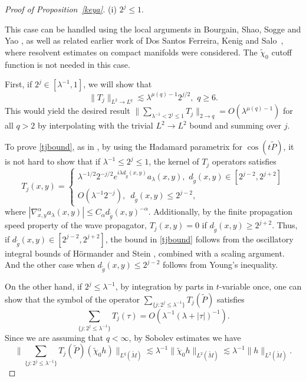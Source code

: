 \documentclass[10pt]{amsart}
\newcommand{\la}{\lambda}
\newcommand{\1}{{\bf 1}}
\begin{document}
\begin{proof}[Proof of Proposition~\ref{keya}]
\noindent(i) $2^j\le 1$.


This case can be handled using the local arguments in 
Bourgain, Shao, Sogge and Yao \cite{BSSY}, as well as related earlier work  of Dos Santos Ferreira, Kenig and Salo~\cite{DKS}, where resolvent estimates on compact manifolds were considered.  The $\tilde\chi_0$ cutoff function is not needed in this case. 


First, if $2^j \in  [\la^{-1},1]$, we will show that
\begin{equation}\label{tjbound}
    \|T_j\|_{L^2\to L^q}\lesssim \la^{\mu(q)-1}2^{j/2},\,\,q\ge 6.
\end{equation}
This would  yield the desired result 
$\| \sum_{\la^{-1} <2^j \le 1} T_j\|_{2\to q}=O(\la^{\mu(q)-1})$ for all $q>2$
by interpolating with the trivial $L^2\to L^2$ bound and summing over $j$.


To prove \eqref{tjbound}, as in \cite{BSSY},
by using the Hadamard parametrix for $\cos (t\tilde P)$, it is not hard to show that if $\la^{-1}\le 2^j\le 1$, the kernel of $T_j$ operators satisfies
\begin{equation}
    T_j(x,y)=\begin{cases}
      \la^{-1/2}2^{-j/2} e^{i\la d_{\tilde g}(x,y)}a_\la(x,y),\,\, d_{\tilde g}(x,y)\in [2^{j-2},2^{j+2}] \\
     O( \la^{-1} 2^{-j}), \,\,\,d_{\tilde g}(x,y)\le 2^{j-2},
    \end{cases}
\end{equation}
where $ |\nabla_{x,y}^\alpha a_\la(x,y)|\le C_\alpha d_{\tilde g}(x,y)^{-\alpha}$. Additionally, by the finite propagation speed property of the wave propagator,  $T_j(x,y)=0$ if $d_{\tilde g}(x,y)\ge 2^{j+2}$.
Thus, if $d_{\tilde g}(x,y)\in [2^{j-2},2^{j+2}]$, the bound in \eqref{tjbound} {follows} from the 
 oscillatory integral bounds of H\"ormander \cite{HormanderIII}
and Stein \cite{steinbeijing}, combined with a  scaling argument. And the other case when $d_{\tilde g}(x,y)\le 2^{j-2}$ follows from Young's inequality.


On the other hand, if $2^j\le \la^{-1}$, 
 by integration by parts in $t$-variable once, one can show that the symbol of the operator $\sum_{\{j:2^j\le \la^{-1}\}} T_j(\tilde P)$ satisfies
\begin{equation}\nonumber
   \sum_{\{j:2^j\le \la^{-1}\}} T_j(\tau)=O(\la^{-1}(\la+|\tau|)^{-1}).
\end{equation}
Since we are assuming that $q<\infty$, by Sobolev estimates we  have
$$\|\sum_{\{j:2^j\le \la^{-1}\}} T_j(\tilde P)(\tilde \chi_0 h)\|_{L^q(\tilde M)}
\lesssim \la^{-1}\|\tilde \chi_0 h\|_{L^2(\tilde M)}\lesssim \la^{-1}\| h\|_{L^2(\tilde M)}.
$$



\end{proof}
\end{document}
